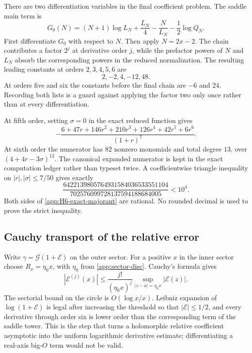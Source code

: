 There are two differentiation variables in the final coefficient problem.
The saddle main term is
\[
 G_0(N)=(N+1)\log L_N+\frac{L_N}{4}-\frac{N}{L_N}
 -\frac12\log Q_N.
\]
First differentiate $G_0$ with respect to $N$.  Then apply
$N=2x-2$.  The chain contributes a factor $2^j$ at derivative order $j$,
while the prefactor powers of $N$ and $L_N$ absorb the corresponding powers
in the reduced normalization.  The resulting leading constants at orders
$2,3,4,5,6$ are
\[
 2,-2,4,-12,48.
\]
At orders five and six the constants before the final chain are $-6$ and
$24$.  Recording both lists is a guard against applying the factor two only
once rather than at every differentiation.

At fifth order, setting $\sigma=0$ in the exact reduced function gives
\begin{equation}\label{app:H5-reduced}
 -\frac{6+47r+146r^2+210r^3+126r^4+42r^5+6r^6}{(1+r)^7}.
\end{equation}
At sixth order the numerator has $82$ nonzero monomials and total degree
$13$, over $(4+4r-3\sigma)^{12}$.  The canonical expanded numerator is kept
in the exact computation ledger rather than typeset twice.  A coefficientwise
triangle inequality on $|r|,|\sigma|\le7/50$ gives exactly
\begin{equation}\label{app:H6-exact-majorant}
 \frac{6422139805764931584036533551104}
 {702576099728137594188684005}<10^4.
\end{equation}
Both sides of \eqref{app:H6-exact-majorant} are rational.  No rounded decimal
is used to prove the strict inequality.

\subsection{Cauchy transport of the relative error}

Write $\gamma=\mathcal G(1+\mathcal E)$ on the outer sector.  For a positive
$x$ in the inner sector choose $R_x=\eta_0x$, with $\eta_0$ from
\eqref{app:sector-disc}.  Cauchy's formula gives
\[
 |\mathcal E^{(j)}(x)|
 \le\frac{j!}{(\eta_0x)^j}
 \sup_{|z-x|=\eta_0x}|\mathcal E(z)|.
\]
The sectorial bound on the circle is $O(\log x/x)$.  Leibniz expansion of
$\log(1+\mathcal E)$ is legal after increasing the threshold so that
$|\mathcal E|\le1/2$, and every derivative through order six is lower order
than the corresponding term of the saddle tower.  This is the step that
turns a holomorphic relative coefficient asymptotic into the uniform
logarithmic derivative estimate; differentiating a real-axis big-$O$ term
would not be valid.

